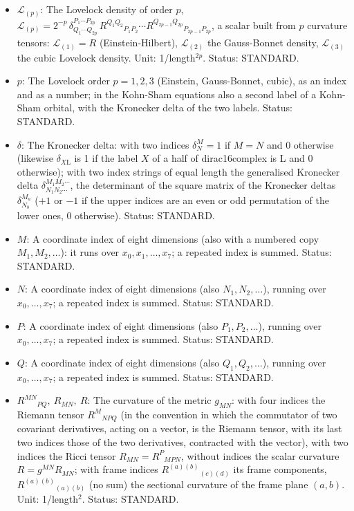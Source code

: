 \documentclass[
  10pt,
]{article}
\providecommand{\tightlist}{%
  \setlength{\itemsep}{0pt}\setlength{\parskip}{0pt}}
\begin{document}
\begin{itemize}
\tightlist
\item
  \(\mathcal{L}_{(p)}\): The Lovelock density of order \(p\),
  \(\mathcal{L}_{(p)} = 2^{-p}\,\delta^{P_1\cdots P_{2p}}_{Q_1\cdots Q_{2p}}\,R^{Q_1Q_2}{}_{P_1P_2}\cdots R^{Q_{2p-1}Q_{2p}}{}_{P_{2p-1}P_{2p}}\),
  a scalar built from \(p\) curvature tensors: \(\mathcal{L}_{(1)} = R\)
  (Einstein-Hilbert), \(\mathcal{L}_{(2)}\) the Gauss-Bonnet density,
  \(\mathcal{L}_{(3)}\) the cubic Lovelock density. Unit:
  1/length\(^{2p}\). Status: STANDARD.
\item
  \(p\): The Lovelock order \(p = 1, 2, 3\) (Einstein, Gauss-Bonnet,
  cubic), as an index and as a number; in the Kohn-Sham equations also a
  second label of a Kohn-Sham orbital, with the Kronecker delta of the
  two labels. Status: STANDARD.
\item
  \(\delta\): The Kronecker delta: with two indices \(\delta^M_N = 1\)
  if \(M = N\) and 0 otherwise (likewise \(\delta_{X\mathrm{L}}\) is 1
  if the label \(X\) of a half of dirac16complex is L and 0 otherwise);
  with two index strings of equal length the generalised Kronecker delta
  \(\delta^{M_1M_2\cdots}_{N_1N_2\cdots}\), the determinant of the
  square matrix of the Kronecker deltas \(\delta^{M_a}_{N_b}\) (\(+1\)
  or \(-1\) if the upper indices are an even or odd permutation of the
  lower ones, 0 otherwise). Status: STANDARD.
\item
  \(M\): A coordinate index of eight dimensions (also with a numbered
  copy \(M_1, M_2, \dots\)): it runs over \(x_0, x_1, \dots, x_7\); a
  repeated index is summed. Status: STANDARD.
\item
  \(N\): A coordinate index of eight dimensions (also
  \(N_1, N_2, \dots\)), running over \(x_0, \dots, x_7\); a repeated
  index is summed. Status: STANDARD.
\item
  \(P\): A coordinate index of eight dimensions (also
  \(P_1, P_2, \dots\)), running over \(x_0, \dots, x_7\); a repeated
  index is summed. Status: STANDARD.
\item
  \(Q\): A coordinate index of eight dimensions (also
  \(Q_1, Q_2, \dots\)), running over \(x_0, \dots, x_7\); a repeated
  index is summed. Status: STANDARD.
\item
  \(R^{MN}{}_{PQ},\ R_{MN},\ R\): The curvature of the metric
  \(g_{MN}\): with four indices the Riemann tensor \(R^M{}_{NPQ}\) (in
  the convention in which the commutator of two covariant derivatives,
  acting on a vector, is the Riemann tensor, with its last two indices
  those of the two derivatives, contracted with the vector), with two
  indices the Ricci tensor \(R_{MN} = R^P{}_{MPN}\), without indices the
  scalar curvature \(R = g^{MN}R_{MN}\); with frame indices
  \(R^{(a)(b)}{}_{(c)(d)}\) its frame components,
  \(R^{(a)(b)}{}_{(a)(b)}\) (no sum) the sectional curvature of the
  frame plane \((a, b)\). Unit: 1/length\(^2\). Status: STANDARD.
\end{itemize}
\end{document}
